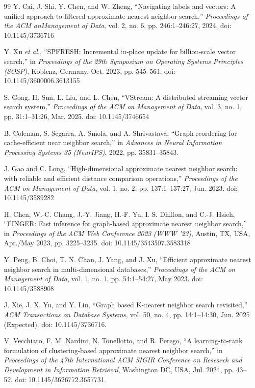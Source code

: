 \documentclass[conference]{IEEEtran}
\begin{document}
\begin{thebibliography}{99}
Y. Cai, J. Shi, Y. Chen, and W. Zheng, “Navigating labels and vectors: A unified approach to filtered approximate nearest neighbor search,” \emph{Proceedings of the ACM onManagement of Data}, vol. 2, no. 6, pp. 246:1–246:27, 2024. doi: 10.1145/3736716

Y. Xu \emph{et al.}, “SPFRESH: Incremental in-place update for billion-scale vector search,” in \emph{Proceedings of the 29th Symposium on Operating Systems Principles (SOSP)}, Koblenz, Germany, Oct. 2023, pp. 545–561. doi: 10.1145/3600006.3613155

S. Gong, H. Sun, L. Liu, and L. Chen, “VStream: A distributed streaming vector search system,” \emph{Proceedings of the ACM on Management of Data}, vol. 3, no. 1, pp. 31:1–31:26, Mar. 2025. doi: 10.1145/3746654

B. Coleman, S. Segarra, A. Smola, and A. Shrivastava, “Graph reordering for cache-efficient near neighbor search,” in \emph{Advances in Neural Information Processing Systems 35 (NeurIPS)}, 2022, pp. 35831–35843.

J. Gao and C. Long, “High-dimensional approximate nearest neighbor search: with reliable and efficient distance comparison operations,” \emph{Proceedings of the ACM on Management of Data}, vol. 1, no. 2, pp. 137:1–137:27, Jun. 2023. doi: 10.1145/3589282

H. Chen, W.-C. Chang, J.-Y. Jiang, H.-F. Yu, I. S. Dhillon, and C.-J. Hsieh, “FINGER: Fast inference for graph-based approximate nearest neighbor search,” in \emph{Proceedings of the ACM Web Conference 2023 (WWW '23)}, Austin, TX, USA, Apr./May 2023, pp. 3225–3235. doi: 10.1145/3543507.3583318

Y. Peng, B. Choi, T. N. Chan, J. Yang, and J. Xu, “Efficient approximate nearest neighbor search in multi-dimensional databases,” \emph{Proceedings of the ACM on Management of Data}, vol. 1, no. 1, pp. 54:1–54:27, May 2023. doi: 10.1145/3588908

J. Xie, J. X. Yu, and Y. Liu, “Graph based K-nearest neighbor search revisited,” \emph{ACM Transactions on Database Systems}, vol. 50, no. 4, pp. 14:1–14:30, Jun. 2025 (Expected). doi: 10.1145/3736716.

V. Vecchiato, F. M. Nardini, N. Tonellotto, and R. Perego, “A learning-to-rank formulation of clustering-based approximate nearest neighbor search,” in \emph{Proceedings of the 47th International ACM SIGIR Conference on Research and Development in Information Retrieval}, Washington DC, USA, Jul. 2024, pp. 43–52. doi: 10.1145/3626772.3657731.


\end{thebibliography}
\end{document}
